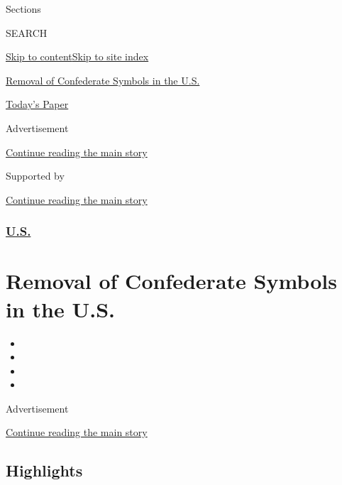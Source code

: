Sections

SEARCH

\protect\hyperlink{site-content}{Skip to
content}\protect\hyperlink{site-index}{Skip to site index}

\href{https://www.nytimes3xbfgragh.onion/news-event/confederate-flags-monuments-statues}{Removal
of Confederate Symbols in the U.S.}

\href{https://myaccount.nytimes3xbfgragh.onion/auth/login?response_type=cookie\&client_id=vi}{}

\href{https://www.nytimes3xbfgragh.onion/section/todayspaper}{Today's
Paper}

Advertisement

\protect\hyperlink{after-top}{Continue reading the main story}

Supported by

\protect\hyperlink{after-sponsor}{Continue reading the main story}

\hypertarget{us}{%
\subsubsection{\texorpdfstring{\href{/section/us}{U.S.}}{U.S.}}\label{us}}

\hypertarget{removal-of-confederate-symbols-in-the-us}{%
\section{Removal of Confederate Symbols in the
U.S.}\label{removal-of-confederate-symbols-in-the-us}}

\begin{itemize}
\item
\item
\item
\item
\end{itemize}

Advertisement

\protect\hyperlink{after-subheader}{Continue reading the main story}

\hypertarget{highlights}{%
\subsection{Highlights}\label{highlights}}


